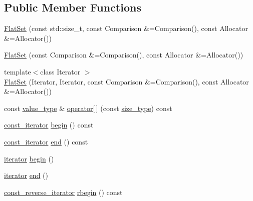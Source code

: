 \subsection*{Public Member Functions}
\begin{DoxyCompactItemize}
\item 
\hyperlink{classnifty_1_1container_1_1FlatSet_a8fdc9c4a6bf11be6e7be0d81d450ae47}{Flat\+Set} (const std\+::size\+\_\+t, const Comparison \&=Comparison(), const Allocator \&=Allocator())
\item 
\hyperlink{classnifty_1_1container_1_1FlatSet_a1f36a0b023633f58bf90e0660f0bc16c}{Flat\+Set} (const Comparison \&=Comparison(), const Allocator \&=Allocator())
\item 
{\footnotesize template$<$class Iterator $>$ }\\\hyperlink{classnifty_1_1container_1_1FlatSet_a4ac0179c196a52ca4cbe2c82b5b7e4fa}{Flat\+Set} (Iterator, Iterator, const Comparison \&=Comparison(), const Allocator \&=Allocator())
\item 
const \hyperlink{classnifty_1_1container_1_1FlatSet_a2366c665ec49d585ff8a77362468d82d}{value\+\_\+type} \& \hyperlink{classnifty_1_1container_1_1FlatSet_a01349d2536d03ca7a225c74030efd75b}{operator\mbox{[}$\,$\mbox{]}} (const \hyperlink{classnifty_1_1container_1_1FlatSet_a06ddeba4c1be37279497ed698dfeb812}{size\+\_\+type}) const 
\item 
\hyperlink{classnifty_1_1container_1_1FlatSet_a0f4cd26da060859b18742abfd534aa24}{const\+\_\+iterator} \hyperlink{classnifty_1_1container_1_1FlatSet_ae9e0bfe8ce64b877afc7755d13d2d960}{begin} () const 
\item 
\hyperlink{classnifty_1_1container_1_1FlatSet_a0f4cd26da060859b18742abfd534aa24}{const\+\_\+iterator} \hyperlink{classnifty_1_1container_1_1FlatSet_aa0c9edc7e64d64c4a80afe12836ad59f}{end} () const 
\item 
\hyperlink{classnifty_1_1container_1_1FlatSet_a9c7fd20cd6b1878ccb8a7e068072c795}{iterator} \hyperlink{classnifty_1_1container_1_1FlatSet_a2965a5b139947cf36bb90d594d3cb6c1}{begin} ()
\item 
\hyperlink{classnifty_1_1container_1_1FlatSet_a9c7fd20cd6b1878ccb8a7e068072c795}{iterator} \hyperlink{classnifty_1_1container_1_1FlatSet_a93ce7a3126ef6e45f1d82cd71c335741}{end} ()
\item 
\hyperlink{classnifty_1_1container_1_1FlatSet_ab7858d2e6eeeb311e21988d9b4a5b802}{const\+\_\+reverse\+\_\+iterator} \hyperlink{classnifty_1_1container_1_1FlatSet_a6c42e14878b4b19f2ead27ecb0be52d0}{rbegin} () const 

\end{DoxyCompactItemize}

